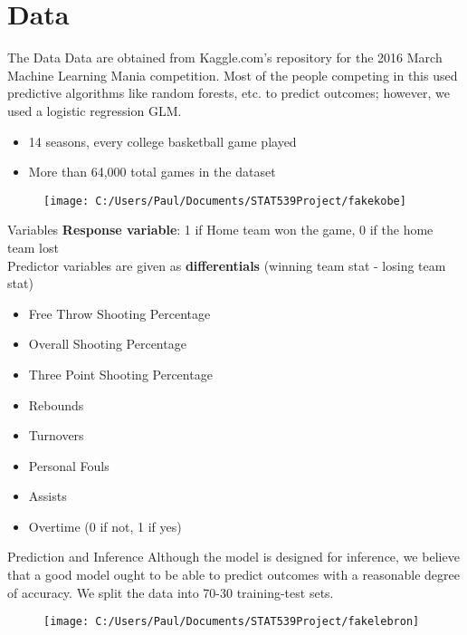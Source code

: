 \documentclass{beamer}
\begin{document}
\section{Data}
\begin{frame}{The Data}
	Data are obtained from Kaggle.com's repository for the 2016 March Machine Learning Mania competition. Most of the people competing in this used predictive algorithms like random forests, etc. to predict outcomes; however, we used a logistic regression GLM. 
		\\
		\begin{itemize}
			\item 14 seasons, every college basketball game played
			\item More than 64,000 total games in the dataset  
						
		\end{itemize}
	
	\begin{figure}
		\texttt{[image: C:/Users/Paul/Documents/STAT539Project/fakekobe]}
	\end{figure}
	
\end{frame}

\begin{frame}{Variables}
\textbf{Response variable}: 1 if Home team won the game, 0 if the home team lost\\
Predictor variables are given as \textbf{differentials} (winning team stat - losing team stat) 

	\begin{multicols}{2}
		
	\begin{itemize}
		\item Free Throw Shooting Percentage
		\item Overall Shooting Percentage
		\item Three Point Shooting Percentage
		\item Rebounds
		\item Turnovers
		\item Personal Fouls
		\item Assists
		\item Overtime (0 if not, 1 if yes)
	\end{itemize}
	
\end{multicols}


\end{frame}

\begin{frame}{Prediction and Inference} 
Although the model is designed for inference, we believe that a good model ought to be able to predict outcomes with a reasonable degree of accuracy. We split the data into 70-30 training-test sets. 
\begin{figure}[r]
	\texttt{[image: C:/Users/Paul/Documents/STAT539Project/fakelebron]}
\end{figure}
\end{frame}
\end{document}

